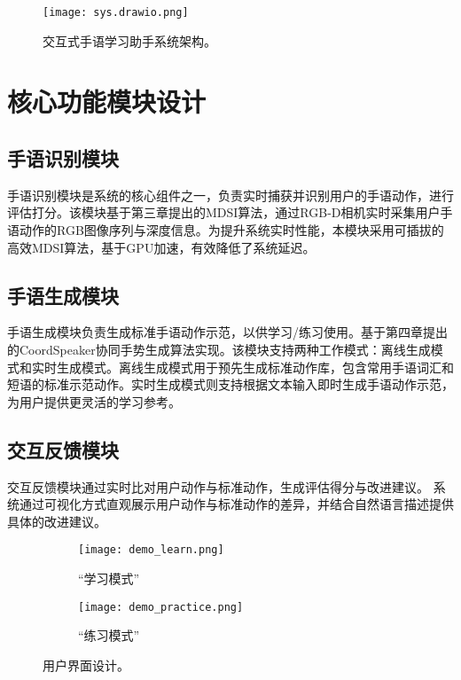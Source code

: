 \begin{figure}
    \centering
    \texttt{[image: sys.drawio.png]}
    \caption{交互式手语学习助手系统架构。}
    \label{fig:system_arch}
  \end{figure}

\section{核心功能模块设计}

\subsection{手语识别模块}
手语识别模块是系统的核心组件之一，负责实时捕获并识别用户的手语动作，进行评估打分。该模块基于第三章提出的MDSI算法，通过RGB-D相机实时采集用户手语动作的RGB图像序列与深度信息。为提升系统实时性能，本模块采用可插拔的高效MDSI算法，基于GPU加速，有效降低了系统延迟。

\subsection{手语生成模块}
手语生成模块负责生成标准手语动作示范，以供学习/练习使用。基于第四章提出的CoordSpeaker协同手势生成算法实现。该模块支持两种工作模式：离线生成模式和实时生成模式。离线生成模式用于预先生成标准动作库，包含常用手语词汇和短语的标准示范动作。实时生成模式则支持根据文本输入即时生成手语动作示范，为用户提供更灵活的学习参考。

\subsection{交互反馈模块}
交互反馈模块通过实时比对用户动作与标准动作，生成评估得分与改进建议。%
系统通过可视化方式直观展示用户动作与标准动作的差异，并结合自然语言描述提供具体的改进建议。%


\begin{figure}
    \centering
    \begin{subfigure}[b]{0.7\linewidth}
        \centering
        \texttt{[image: demo\_learn.png]}
        \caption{“学习模式”}
    \end{subfigure}
    \hfill
    \begin{subfigure}[b]{0.7\linewidth}
        \centering
        \texttt{[image: demo\_practice.png]}
        \caption{“练习模式”}
    \end{subfigure}
    \caption{用户界面设计。}
    \label{fig:ui_design}
\end{figure}
  
